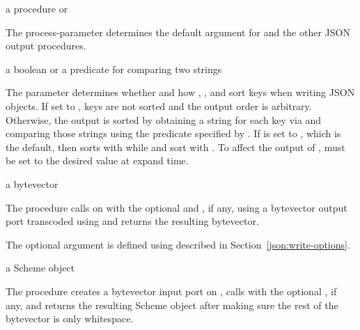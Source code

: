 \begin{parameter}
\end{parameter}
\returns{} a procedure or 

The  process-parameter determines the default
 argument for  and the other JSON
output procedures.

\begin{parameter}
\end{parameter}
\returns{} a boolean or a predicate for comparing two strings

The  parameter determines whether and how
, , and  sort keys
when writing JSON objects.
If set to , keys are not sorted and the output order is arbitrary.
Otherwise, the output is sorted by obtaining a string for each key
via  and comparing those strings using the predicate
specified by .
If  is set to , which is the default,
then  sorts with 
while  and  sort with
.
To affect the output of ,  must
be set to the desired value at expand time.

\begin{procedure}
\end{procedure}
\returns{} a bytevector

The  procedure calls 
on  with the optional  and , if
any, using a bytevector output port transcoded using
 and returns the resulting bytevector.

The optional  argument is defined using
 described in
Section~\ref{json:write-options}.

\begin{procedure}
\end{procedure}
\returns{} a Scheme object

The  procedure creates a bytevector input port
on , calls  with the optional ,
if any, and returns the resulting Scheme object after making sure the rest
of the bytevector is only whitespace.

